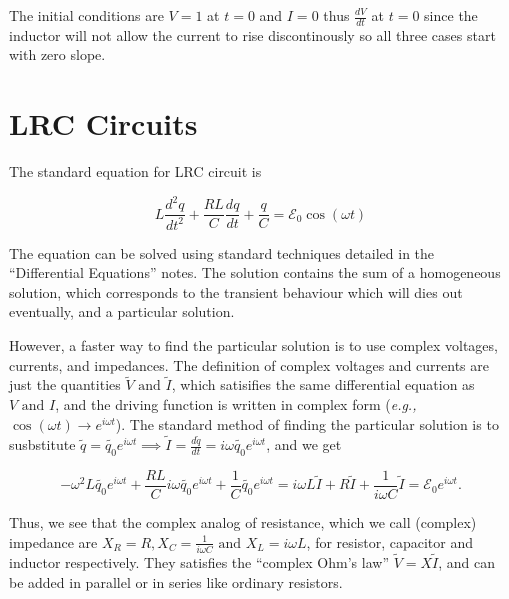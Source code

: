 \documentclass[english,a4paper,12pt]{report}
\begin{document}
The initial conditions are \(V=1\) at \(t=0\) and \(I = 0\)  thus \(\displaystyle \frac{dV}{dt} \)  at \(t=0\)  since the inductor will not allow the current to rise discontinously so all three cases start with zero slope.

\section{LRC Circuits}

The standard equation for LRC circuit is 

\begin{equation}
     L\frac{d^2q}{dt^2} + \frac{RL}{C}\frac{dq}{dt} + \frac{q}{C} = \mathcal{E}_{0}\cos (\omega t) 
\end{equation}

The equation can be solved using standard techniques detailed in the ``Differential Equations'' notes. The solution contains the sum of a homogeneous solution, which corresponds to the transient behaviour which will dies out eventually, and a particular solution. 

However, a faster way to find the particular solution is to use complex voltages, currents, and impedances. The definition of complex voltages and currents are just the quantities \(\tilde{V} \text { and } \tilde{I} \), which satisifies the same differential equation as \(V \text { and } I\), and the driving function is written in complex form (\textit{e.g.,} \(\cos (\omega t) \to e^{i \omega t} \)). The standard method of finding the particular solution is to susbstitute \(\displaystyle \tilde{q}  = \tilde{q_0 }e^{i \omega t} \implies \tilde{I} = \frac{d \tilde{q} }{dt} = i \omega \tilde{q_0 } e^{i \omega t}\), and we get

\begin{equation}
    -\omega ^2 L \tilde{q_0 }e^{i \omega t} + \frac{RL}{C} i \omega \tilde{q_0 } e^{i \omega t} + \frac{1}{C} \tilde{q_0 }e^{i \omega t} = i \omega L \tilde{I} + R \tilde{I} + \frac{1}{i \omega C} \tilde{I} = \mathcal{E}_{0}e^{i \omega t}.        
\end{equation}

Thus, we see that the complex analog of resistance, which we call (complex) impedance are \(\displaystyle X_{R} = R, X_{C} = \frac{1}{i \omega C} \text { and } X_{L} = i \omega L \), for resistor, capacitor and inductor respectively. They satisfies the ``complex Ohm's law'' \(\tilde{V} = X \tilde{I} \), and can be added in parallel or in series like ordinary resistors. 
\end{document}
